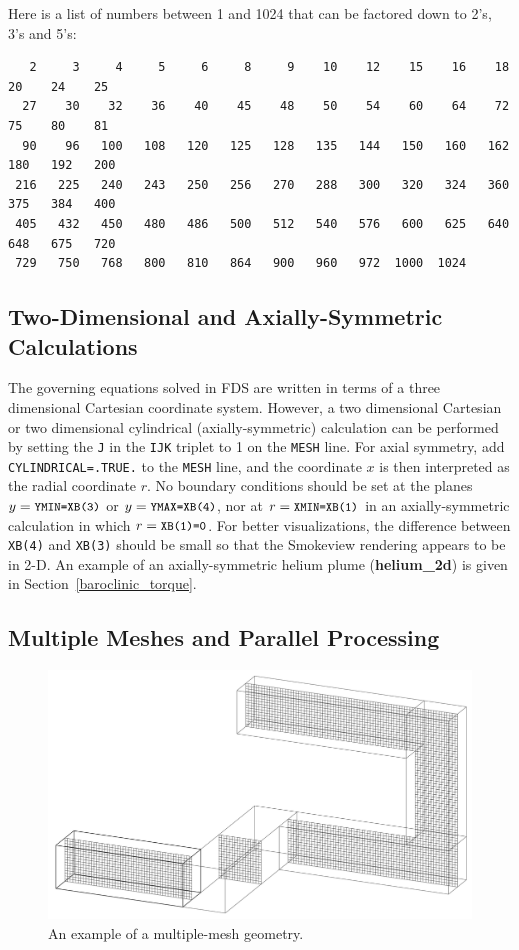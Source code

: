 \documentclass[11pt]{book}
\newcommand{\ct}{\tt\small}
\begin{document}
Here is a list of numbers between 1 and 1024 that can be factored
down to 2's, 3's and 5's:

\footnotesize
\begin{verbatim}
   2     3     4     5     6     8     9    10    12    15    16    18    20    24    25
  27    30    32    36    40    45    48    50    54    60    64    72    75    80    81
  90    96   100   108   120   125   128   135   144   150   160   162   180   192   200
 216   225   240   243   250   256   270   288   300   320   324   360   375   384   400
 405   432   450   480   486   500   512   540   576   600   625   640   648   675   720
 729   750   768   800   810   864   900   960   972  1000  1024
\end{verbatim}
\normalsize


\subsection{Two-Dimensional and Axially-Symmetric Calculations}
\label{info:2D}

The governing equations solved in FDS are written in terms of a
three dimensional Cartesian coordinate system. However,
a two dimensional Cartesian or two dimensional cylindrical
(axially-symmetric) calculation can be performed by setting the {\ct J} in the {\ct IJK} triplet
to 1 on the {\ct MESH} line. For axial symmetry, add {\ct CYLINDRICAL=.TRUE.} to the
{\ct MESH} line, and the coordinate $x$ is then interpreted as the radial coordinate $r$.
No boundary conditions should be set at the planes $y=\hbox{\ct YMIN=XB(3)}$ or
$y=\hbox{\ct YMAX=XB(4)}$, nor at $r=\hbox{\ct XMIN=XB(1)}$ in an axially-symmetric
calculation in which $r=\hbox{\ct XB(1)=0}$. For better visualizations, the difference between
{\ct XB(4)} and {\ct XB(3)} should be small so that the Smokeview rendering appears to be in 2-D.
An example of an axially-symmetric helium plume ({\bf helium\_2d}) is given in Section~\ref{baroclinic_torque}.


\subsection{Multiple Meshes and Parallel Processing}
\label{info:multimesh}


\begin{figure}[ht!]
\includegraphics[width=\textwidth]{FIGURES/hallways.jpg}
\caption{An example of a multiple-mesh geometry.}
\label{fig:domain}
\end{figure}
\end{document}
